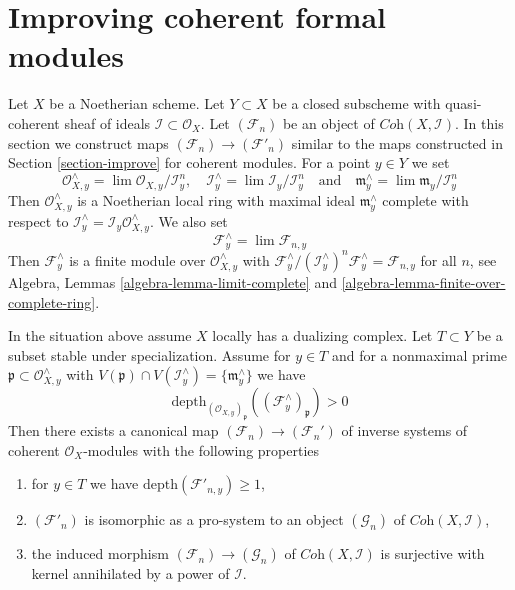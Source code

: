 \section{Improving coherent formal modules}
\label{section-improving-formal-modules}

\noindent
Let $X$ be a Noetherian scheme. Let $Y \subset X$ be a closed subscheme
with quasi-coherent sheaf of ideals $\mathcal{I} \subset \mathcal{O}_X$.
Let $(\mathcal{F}_n)$ be an object of $\textit{Coh}(X, \mathcal{I})$.
In this section we construct maps
$(\mathcal{F}_n) \to (\mathcal{F}'_n)$
similar to the maps constructed in Section \ref{section-improve}
for coherent modules. For a point $y \in Y$ we set
$$
\mathcal{O}_{X, y}^\wedge = \lim \mathcal{O}_{X, y}/\mathcal{I}^n_y, \quad
\mathcal{I}_y^\wedge = \lim \mathcal{I}_y/\mathcal{I}^n_y
\quad\text{and}\quad
\mathfrak m_y^\wedge = \lim \mathfrak m_y/\mathcal{I}_y^n
$$
Then $\mathcal{O}_{X, y}^\wedge$ is a Noetherian local ring
with maximal ideal $\mathfrak m_y^\wedge$ complete with respect to
$\mathcal{I}_y^\wedge = \mathcal{I}_y\mathcal{O}_{X, y}^\wedge$.
We also set
$$
\mathcal{F}_y^\wedge = \lim \mathcal{F}_{n, y}
$$
Then $\mathcal{F}_y^\wedge$ is a finite module over
$\mathcal{O}_{X, y}^\wedge$ with
$\mathcal{F}_y^\wedge/(\mathcal{I}_y^\wedge)^n\mathcal{F}_y^\wedge =
\mathcal{F}_{n, y}$ for all $n$, see Algebra, Lemmas
\ref{algebra-lemma-limit-complete} and
\ref{algebra-lemma-finite-over-complete-ring}.

\begin{lemma}
\label{lemma-divide-torsion-formal-coherent-module}
In the situation above assume $X$ locally has a dualizing complex.
Let $T \subset Y$ be a subset stable under specialization.
Assume for $y \in T$ and for a nonmaximal prime
$\mathfrak p \subset \mathcal{O}_{X, y}^\wedge$ with
$V(\mathfrak p) \cap V(\mathcal{I}^\wedge_y) = \{\mathfrak m_y^\wedge\}$
we have
$$
\text{depth}_{(\mathcal{O}_{X, y})_\mathfrak p}
((\mathcal{F}^\wedge_y)_\mathfrak p) > 0
$$
Then there exists a canonical map
$(\mathcal{F}_n) \to (\mathcal{F}_n')$
of inverse systems of coherent $\mathcal{O}_X$-modules
with the following properties
\begin{enumerate}
\item for $y \in T$ we have $\text{depth}(\mathcal{F}'_{n, y}) \geq 1$,
\item $(\mathcal{F}'_n)$ is isomorphic as a pro-system to an object
$(\mathcal{G}_n)$ of $\textit{Coh}(X, \mathcal{I})$,
\item the induced morphism
$(\mathcal{F}_n) \to (\mathcal{G}_n)$ of
$\textit{Coh}(X, \mathcal{I})$ is surjective with kernel
annihilated by a power of $\mathcal{I}$.
\end{enumerate}
\end{lemma}

